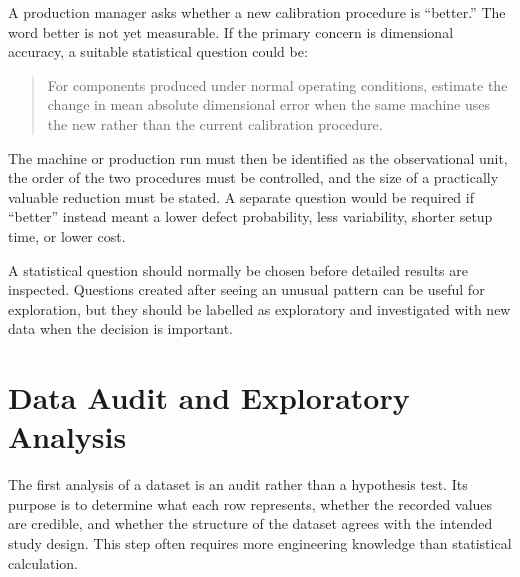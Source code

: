 \begin{example}\par
A production manager asks whether a new calibration procedure is ``better.'' The word better is not yet measurable. If the primary concern is dimensional accuracy, a suitable statistical question could be:

\begin{quote}
For components produced under normal operating conditions, estimate the change in mean absolute dimensional error when the same machine uses the new rather than the current calibration procedure.
\end{quote}

The machine or production run must then be identified as the observational unit, the order of the two procedures must be controlled, and the size of a practically valuable reduction must be stated. A separate question would be required if ``better'' instead meant a lower defect probability, less variability, shorter setup time, or lower cost.
\end{example}

A statistical question should normally be chosen before detailed results are inspected. Questions created after seeing an unusual pattern can be useful for exploration, but they should be labelled as exploratory and investigated with new data when the decision is important.

\section{Data Audit and Exploratory Analysis}
\label{sec:data-audit-exploration}

The first analysis of a dataset is an audit rather than a hypothesis test. Its purpose is to determine what each row represents, whether the recorded values are credible, and whether the structure of the dataset agrees with the intended study design. This step often requires more engineering knowledge than statistical calculation.


